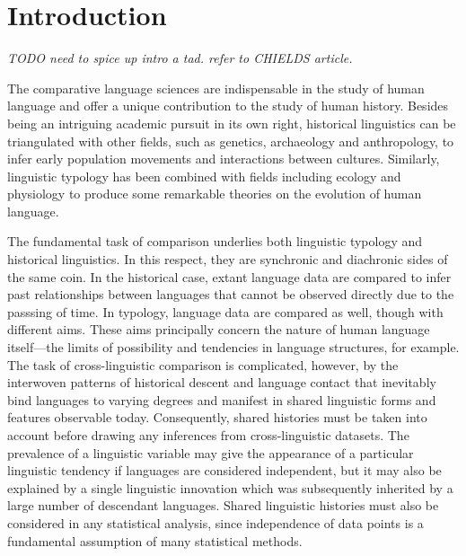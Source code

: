 \hypertarget{pcm-intro}{%
\section{Introduction}\label{pcm-intro}}


\emph{TODO need to spice up intro a tad. refer to CHIELDS article.}

The comparative language sciences are indispensable in the study of human language and offer a unique contribution to the study of human history. Besides being an intriguing academic pursuit in its own right, historical linguistics can be triangulated with other fields, such as genetics, archaeology and anthropology, to infer early population movements and interactions between cultures. Similarly, linguistic typology has been combined with fields including ecology and physiology to produce some remarkable theories on the evolution of human language.

The fundamental task of comparison underlies both linguistic typology and historical linguistics. In this respect, they are synchronic and diachronic sides of the same coin. In the historical case, extant language data are compared to infer past relationships between languages that cannot be observed directly due to the passsing of time. In typology, language data are compared as well, though with different aims. These aims principally concern the nature of human language itself---the limits of possibility and tendencies in language structures, for example. The task of cross-linguistic comparison is complicated, however, by the interwoven patterns of historical descent and language contact that inevitably bind languages to varying degrees and manifest in shared linguistic forms and features observable today. Consequently, shared histories must be taken into account before drawing any inferences from cross-linguistic datasets. The prevalence of a linguistic variable may give the appearance of a particular linguistic tendency if languages are considered independent, but it may also be explained by a single linguistic innovation which was subsequently inherited by a large number of descendant languages. Shared linguistic histories must also be considered in any statistical analysis, since independence of data points is a fundamental assumption of many statistical methods.

